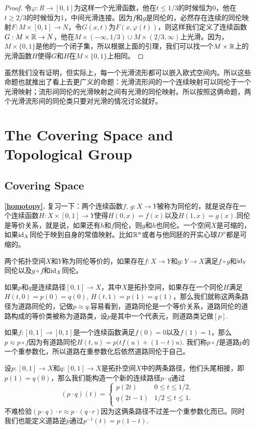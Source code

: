 \begin{proof}
令$\varphi:R\to [0,1]$为这样一个光滑函数，他在$t\leq 1/3$的时候恒为0，他在$t\geq 2/3$的时候恒为1，中间光滑连接。因为$f$和$g$是同伦的，必然存在连续的同伦映射$F:M\times [0,1]\to N$，令$G(x,t)$为$F(x,\varphi(t))$，则这样我们定义了连续函数$G:M\times \mathbb{R} \to N$，他在$M\times (-\infty,1/3)\cup M\times (2/3,\infty)$上光滑。因为，$M\times \{0,1\}$是他的一个闭子集，所以根据上面的引理，我们可以找一个$M\times \mathbb{R}$上的光滑函数$H$使得$G$和$H$在$M\times \{0,1\}$上相同。
\end{proof}

虽然我们没有证明，但实际上，每一个光滑流形都可以嵌入欧式空间内。所以这些命题也就推出了看上去更广义的命题：光滑流形间的一个连续映射可以同伦于一个光滑映射；流形间同伦的光滑映射之间有光滑的同伦映射。所以按照这俩命题，两个光滑流形间的同伦类只要对光滑的情况讨论就好。

\chapter{The Covering Space and Topological Group}

\section*{Covering Space}

\noindent\textbf{\ref{homotopy}.} 复习一下：两个连续函数$f$, $g:X\to Y$被称为{\kaishu 同伦}的，就是说存在一个连续函数$H:X\times [0,1]\to Y$使得$H(0,x)=f(x)$以及$H(1,x)=g(x)$.同伦是等价关系，就是说，如果还有$h$和$f$同伦，则$g$和$h$也同伦。一个空间$X$是可缩的，如果$\operatorname{id}_X$同伦于映到自身的常值映射。比如$\mathbb{R}^n$或者与他同胚的开实心球$D^n$都是可缩的。

两个拓扑空间$X$和$Y$称为同伦等价的，如果存在$f:X\to Y$和$g:Y\to X$满足$f\circ g$和$\operatorname{id}_Y$同伦以及$g\circ f$和$\operatorname{id}_X$同伦。

\para 如果$p$和$q$是连续路径$[0,1]\to X$，其中$X$是拓扑空间，如果存在一个同伦$H$满足$H(t,0)=p(0)=q(0)$, $H(t,1)=p(1)=q(1)$，那么我们就称这两条路径为{\kaishu 道路同伦}的，记做$p \approx q$.容易看到，道路同伦是一个等价关系，道路同伦的道路构成的等价类被称为道路类，设$p$是其中一个代表元，则道路类记做$[p]$.

如果$f:[0,1]\to[0,1]$是一个连续函数满足$f(0)=0$以及$f(1)=1$，那么$p\approx p\circ f$因为有道路同伦$H(t,u)=p\bigl(tf(u)+(1-t)u\bigr)$. 我们称$p\circ f$是道路$p$的一个重参数化，所以道路在重参数化后依然道路同伦于自己。

设$p : [0,1] \to X$和$q : [0,1] \to X$是拓扑空间$X$中的两条路径，他们头尾相接，即$p(1)=q(0)$，那么我们能构造一个新的连续路径$p\cdot q$通过
\[
	(p\cdot q)(t)=
	\begin{cases}
		p(2t) &0 \leq t\leq 1/2,\\
		q(2t-1)&1/2 \leq t\leq 1.\\
	\end{cases}
\]
不难检验$(p\cdot q)\cdot r \approx p\cdot (q\cdot r)$因为这俩条路径不过差一个重参数化而已。同时我们也能定义道路逆$\overline{p}$通过$p^{-1}(t)=p(1-t)$.

